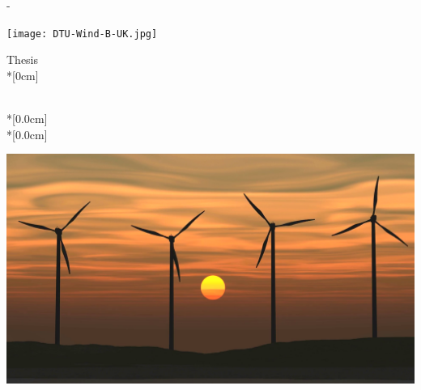 \thispagestyle{empty}             %
\calccentering{\unitlength}
\begin{adjustwidth*}{\unitlength}{-\unitlength}
    \begin{adjustwidth}{-0.5cm}{-0.5cm}
        \sffamily
        \noindent
        \texttt{[image: DTU-Wind-B-UK.jpg]} \hfill
        \begin{flushright}
        	\thesistypeabbr{} Thesis\\*[0cm]
        \end{flushright}

		\begin{vplace}[1.0]
			\noindent
			\newline \newline
			\huge \thesistitle{}\\*[0.0cm]
			\LARGE \thesissubtitle{}\\*[0.0cm]

			\noindent
		    \includegraphics[width=1.0\textwidth]{graphics/wind_farm_sunset.png} \vfill
		\end{vplace}
        

\end{adjustwidth}
\end{adjustwidth*}

